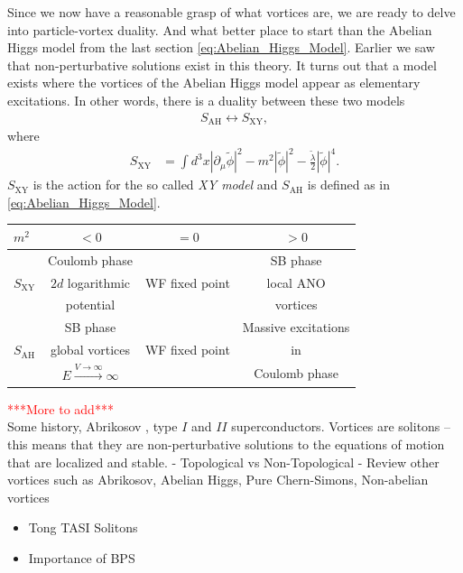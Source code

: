     Since we now have a reasonable grasp of what vortices are, we are ready to delve into particle-vortex duality. And what better place to start than the Abelian Higgs model from the last section \eqref{eq:Abelian_Higgs_Model}. Earlier we saw that non-perturbative solutions exist in this theory. It turns out that a model exists where the vortices of the Abelian Higgs model appear as elementary excitations. In other words, there is a duality between these two models
    \begin{align}
        S_{\text{AH}} \longleftrightarrow S_{\text{XY}},
    \end{align}
    where
    \begin{align}
        S_{\text{XY}} &= \int d^3x |\partial_{\mu}\tilde{\phi}|^2-m^2 |\tilde{\phi}|^2 - \frac{\tilde{\lambda}}{2} |\tilde{\phi}|^4.
    \end{align}
    $S_{\text{XY}}$ is the action for the so called \textit{XY model} and $S_{\text{AH}}$ is defined as in \eqref{eq:Abelian_Higgs_Model}.

\begin{center}
  \begin{tabular}{| l | c | c | c|}
      \hline
    $m^2$ & $<0$ & $=0$ & $>0$\\ \hline
     & Coulomb phase &  & SB phase\\ 
    $S_{\text{XY}}$ & $2d$ logarithmic & WF fixed point & local ANO \\ 
     & potential &  & vortices \\ \hline
      & SB phase &  &  Massive excitations\\
    $S_{\text{AH}}$ & global vortices & WF fixed point & in\\
      & $E\xrightarrow{V \rightarrow \infty} \infty$ &  & Coulomb phase \\
    \hline
  \end{tabular}
\end{center}



\textcolor{red}{***More to add***}\\
Some history, Abrikosov \cite{Abrikosov1957}, type $I$ and $II$ superconductors. Vortices are solitons -- this means that they are non-perturbative solutions to the equations of motion that are localized and stable.
            - Topological vs Non-Topological
            - Review other vortices such as Abrikosov, Abelian Higgs, Pure Chern-Simons, Non-abelian vortices


    \begin{itemize}
        \item Tong TASI Solitons \cite{hep-th/0509216}
        \item Importance of BPS \cite{Bogomolny:1975de, Prasad1975}
    \end{itemize}
